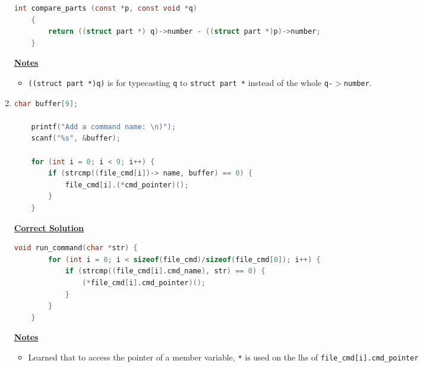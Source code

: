 \documentclass[12pt]{article}
\begin{document}
\begin{enumerate}[1.]
\begin{mdframed}
    \bigskip

\begin{lstlisting}[language=c]
    int compare_parts (const *p, const void *q)
    {
        return ((struct part *) q)->number - ((struct part *)p)->number;
    }
\end{lstlisting}

    \end{mdframed}

    \bigskip

    \underline{\textbf{Notes}}

    \begin{itemize}
        \item \texttt{((struct part *)q)} is for typecasting \texttt{q} to \texttt{struct part *}
        instead of the whole \texttt{q-$>$number}.
    \end{itemize}

    \item

\begin{lstlisting}[language=c]
    char buffer[9];

    printf("Add a command name: \n)");
    scanf("%s", &buffer);

    for (int i = 0; i < 9; i++) {
        if (strcmp((file_cmd[i])-> name, buffer) == 0) {
            file_cmd[i].(*cmd_pointer)();
        }
    }
\end{lstlisting}

    \bigskip

    \begin{mdframed}
    \underline{\textbf{Correct Solution}}

    \bigskip

\begin{lstlisting}[language=c]
    void run_command(char *str) {
        for (int i = 0; i < sizeof(file_cmd)/sizeof(file_cmd[0]); i++) {
            if (strcmp((file_cmd[i].cmd_name), str) == 0) {
                (*file_cmd[i].cmd_pointer)();
            }
        }
    }
\end{lstlisting}
    \end{mdframed}

    \underline{\textbf{Notes}}

    \begin{itemize}
        \item Learned that to access the pointer of a member variable, \texttt{*} is
        used on the lhs of \texttt{file\_cmd[i].cmd\_pointer}

        \bigskip


\end{itemize}
\end{enumerate}
\end{document}
